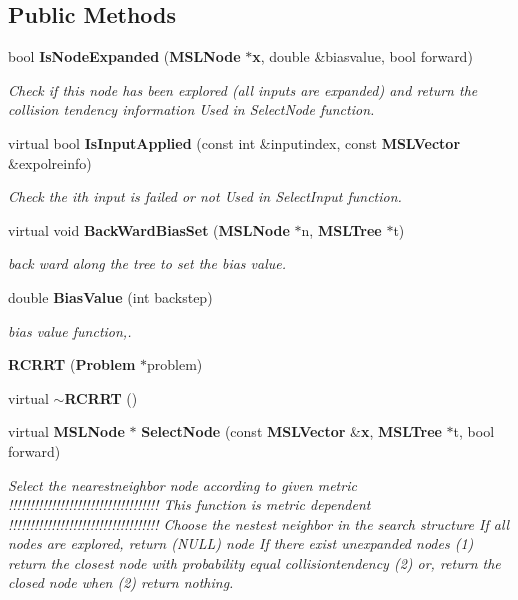 \subsection*{Public Methods}
\begin{CompactItemize}
\item 
bool {\bf Is\-Node\-Expanded} ({\bf MSLNode} $\ast${\bf x}, double \&biasvalue, bool forward)
\begin{CompactList}\small\item\em Check if this node has been explored (all inputs are expanded) and return the collision tendency information Used in Select\-Node function.\item\end{CompactList}\item 
virtual bool {\bf Is\-Input\-Applied} (const int \&inputindex, const {\bf MSLVector} \&expolreinfo)
\begin{CompactList}\small\item\em Check the ith input is failed or not Used in Select\-Input function.\item\end{CompactList}\item 
virtual void {\bf Back\-Ward\-Bias\-Set} ({\bf MSLNode} $\ast$n, {\bf MSLTree} $\ast$t)
\begin{CompactList}\small\item\em back ward along the tree to set the bias value.\item\end{CompactList}\item 
double {\bf Bias\-Value} (int backstep)
\begin{CompactList}\small\item\em bias value function,.\item\end{CompactList}\item 
{\bf RCRRT} ({\bf Problem} $\ast$problem)
\item 
virtual {\bf $\sim$RCRRT} ()
\item 
virtual {\bf MSLNode} $\ast$ {\bf Select\-Node} (const {\bf MSLVector} \&{\bf x}, {\bf MSLTree} $\ast$t, bool forward)
\begin{CompactList}\small\item\em Select the nearestneighbor node according to given metric !!!!!!!!!!!!!!!!!!!!!!!!!!!!!!!!!!! This function is metric dependent !!!!!!!!!!!!!!!!!!!!!!!!!!!!!!!!!!! Choose the nestest neighbor in the search structure If all nodes are explored, return (NULL) node If there exist unexpanded nodes (1) return the closest node with probability equal collisiontendency (2) or, return the closed node when (2) return nothing.\item\end{CompactList}\item 

\end{CompactItemize}
